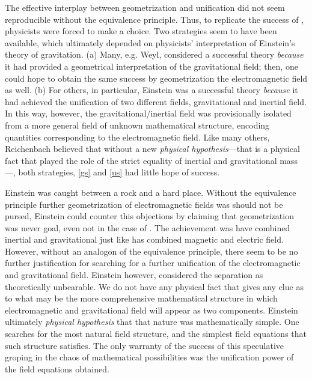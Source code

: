 \documentclass[draft]{article}
\begin{document}
The effective interplay between geometrization and unification did not seem reproducible without the equivalence principle. Thus, to replicate the success of \gr, physicists were forced to make a choice. Two strategies seem to have been available, which ultimately depended on physicists' interpretation of Einstein's theory of gravitation. (a) Many, e.g. Weyl, considered \gr a successful theory \emph{because} it had provided a geometrical interpretation of the gravitational field; then, one could hope to obtain the same success by geometrization the electromagnetic field as well. (b) For others, in particular, Einstein \gr was a successful theory \emph{because} it had achieved the unification of two different fields, gravitational and inertial field. In this way, however, the gravitational/inertial field was provisionally isolated from a more general field of unknown mathematical structure, encoding quantities corresponding to the electromagnetic field. Like many others, Reichenbach believed that without a new \emph{physical hypothesis}---that is a physical fact that played the role of the strict equality of inertial and gravitational mass---, both strategies, \cref{gs} and \cref{us} had little hope of success.

Einstein was caught between a rock and a hard place. Without the equivalence principle further geometrization of electromagnetic fields was should not be pursed, Einstein could counter this objections by claiming that geometrization was never goal, even not in the case of \rt. The achievement \gr was have combined inertial and gravitational just like \sr has combined magnetic and electric field. However, without an analogon of the equivalence principle, there seem to be no further justification for searching for a further unification of the electromagnetic and gravitational field. Einstein however, considered the separation as theoretically unbearable. We do not have any physical fact that gives any clue as to what may be the more comprehensive mathematical structure in which electromagnetic and gravitational field will appear as two components. Einstein ultimately \emph{physical hypothesis} that that nature was mathematically simple. One searches for the most natural field structure, and the simplest field equations that such structure satisfies. The only warranty of the success of this speculative groping in the chaos of mathematical possibilities was the unification power of the field equations obtained. 
\end{document}
